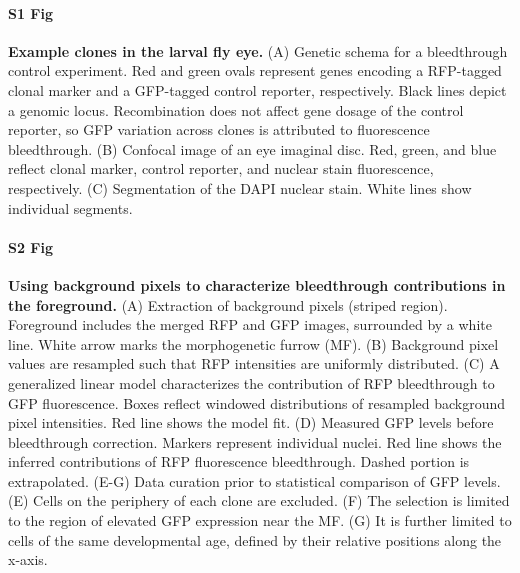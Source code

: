 \documentclass[10pt,letterpaper]{article}
\begin{document}
\paragraph*{S1 Fig}
\label{S1_Fig}
{\bf Example clones in the larval fly eye.} (A) Genetic schema for a bleedthrough control experiment. Red and green ovals represent genes encoding a RFP-tagged clonal marker and a GFP-tagged control reporter, respectively. Black lines depict a genomic locus. Recombination does not affect gene dosage of the control reporter, so GFP variation across clones is attributed to fluorescence bleedthrough. (B) Confocal image of an eye imaginal disc. Red, green, and blue reflect clonal marker, control reporter, and nuclear stain fluorescence, respectively. (C) Segmentation of the DAPI nuclear stain. White lines show individual segments.

\paragraph*{S2 Fig}
\label{S2_Fig}
{\bf Using background pixels to characterize bleedthrough contributions in the foreground.} (A) Extraction of background pixels (striped region). Foreground includes the merged RFP and GFP images, surrounded by a white line. White arrow marks the morphogenetic furrow (MF). (B) Background pixel values are resampled such that RFP intensities are uniformly distributed. (C) A generalized linear model characterizes the contribution of RFP bleedthrough to GFP fluorescence. Boxes reflect windowed distributions of resampled background pixel intensities. Red line shows the model fit. (D) Measured GFP levels before bleedthrough correction. Markers represent individual nuclei. Red line shows the inferred contributions of RFP fluorescence bleedthrough. Dashed portion is extrapolated. (E-G) Data curation prior to statistical comparison of GFP levels. (E) Cells on the periphery of each clone are excluded. (F) The selection is limited to the region of elevated GFP expression near the MF. (G) It is further limited to cells of the same developmental age, defined by their relative positions along the x-axis.
\end{document}
